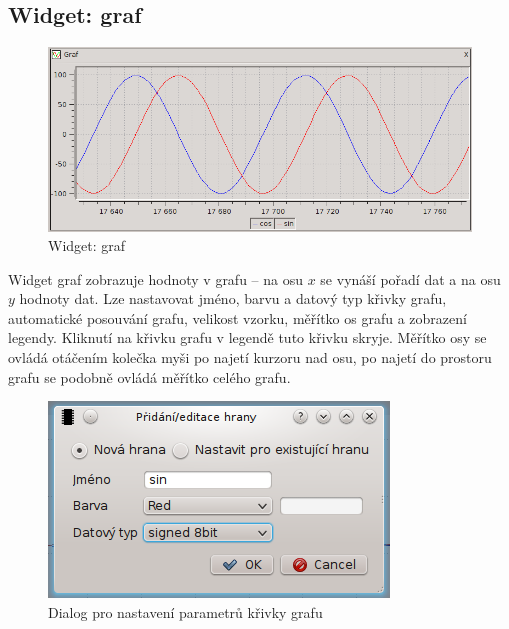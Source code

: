 \documentclass[12pt, a4paper, oneside]{article}
\begin{document}
\subsection{Widget: graf}
\begin{figure}[h]
\begin{center}
\includegraphics[scale=0.65]{img/w_graph.png}
\caption{Widget: graf}
\end{center}
\end{figure}
Widget graf zobrazuje hodnoty v grafu -- na osu $x$ se vynáší pořadí dat a na osu $y$ hodnoty dat. Lze nastavovat jméno, barvu a datový typ křivky grafu, automatické posouvání grafu, velikost vzorku, měřítko os grafu a zobrazení legendy. Kliknutí na křivku grafu v legendě tuto křivku skryje. Měřítko osy se ovládá otáčením kolečka myši po najetí kurzoru nad osu, po najetí do prostoru grafu se podobně ovládá měřítko celého grafu. 
\begin{figure}[h]
\begin{center}
\includegraphics[scale=0.8]{img/w_graph_add.png}
\caption{Dialog pro nastavení parametrů křivky grafu}
\end{center}
\end{figure}

\newpage
\end{document}
